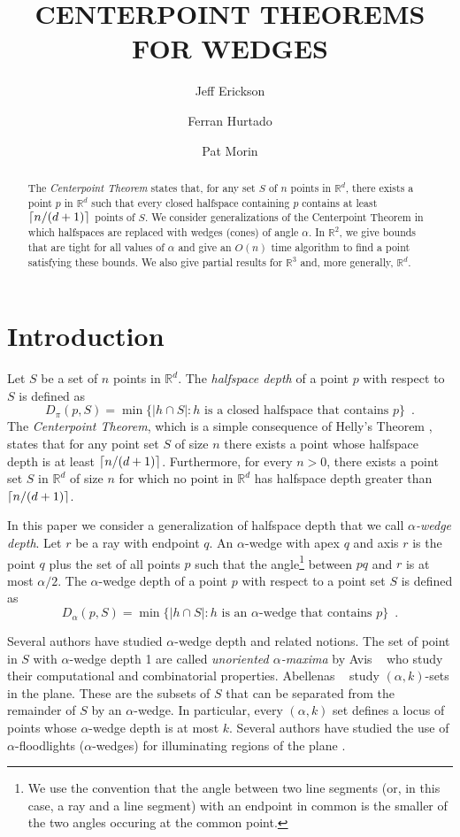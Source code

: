 \documentclass[lotsofwhite]{patmorin}
\title{\MakeUppercase{Centerpoint Theorems for Wedges}}
\author{Jeff Erickson \and
	Ferran Hurtado \and
	Pat Morin}
\date{}
\newcommand{\R}{\mathbb{R}}
\begin{document}
\maketitle

\begin{abstract}
The \emph{Centerpoint Theorem} states that, for any set $S$ of $n$
points in $\R^d$, there exists a point $p$ in $\R^d$
such that every closed halfspace containing $p$ contains at least
$\left\lceil n/(d+1) \right\rceil$ points of $S$.  We consider generalizations of the
Centerpoint Theorem in which halfspaces are replaced with wedges
(cones) of angle $\alpha$.  In $\R^2$, we give bounds that are tight
for all values of $\alpha$ and give an $O(n)$ time algorithm to find a
point satisfying these bounds.  We also give partial results for 
$\R^3$ and, more generally, $\R^d$.
\end{abstract}

\section{Introduction}

Let $S$ be a set of $n$ points in $\R^d$.  The \emph{halfspace
depth} \cite{t75} of a point $p$ with respect to $S$ is defined as
\[
D_\pi(p,S) = 
   \min\{|h\cap S| : \mbox{$h$ is a closed halfspace that contains $p$} \}
    \enspace .
\]
The \emph{Centerpoint Theorem}, which is a simple consequence of
Helly's Theorem \cite{e93}, states that for any point set $S$ of size
$n$ there exists a point whose halfspace depth is at least
$\left\lceil n/(d+1) \right\rceil$.  Furthermore, for every $n>0$, there exists a point
set $S$ in $\R^d$ of size $n$ for which no point in
$\R^d$ has halfspace depth greater than $\left\lceil n/(d+1) \right\rceil$. 

In this paper we consider a generalization of halfspace depth that we
call \emph{$\alpha$-wedge depth}. Let $r$ be a ray with endpoint $q$.
An $\alpha$-wedge with apex $q$ and axis $r$ is the point $q$ plus 
the set of all points
$p$ such that the angle\footnote{We use the convention that the angle
between two line segments (or, in this case, a ray and a line segment)
with an endpoint in common is the smaller of the two angles occuring
at the common point.} between $pq$ and $r$ is at most $\alpha/2$.  The
$\alpha$-wedge depth of a point $p$ with respect to a point set $S$ is
defined as
\[
D_\alpha(p,S) =
   \min\{|h\cap S| : \mbox{$h$ is an $\alpha$-wedge that contains $p$} \} 
   \enspace .
\]

Several authors have studied $\alpha$-wedge depth and related notions.
The set of point in $S$ with $\alpha$-wedge depth 1 are called
\emph{unoriented $\alpha$-maxima} by Avis \etal\ \cite{abd99} who study
their computational and combinatorial properties.  Abellenas \etal\
\cite{achs02} study $(\alpha,k)$-sets in the plane.  These are the
subsets of $S$ that can be separated from the remainder of $S$ by an
$\alpha$-wedge.  In particular, every $(\alpha,k)$ set defines a locus
of points whose $\alpha$-wedge depth is at most $k$.  Several authors
have studied the use of $\alpha$-floodlights ($\alpha$-wedges) for
illuminating regions of the plane \cite{ecoux95,mo01}.
\end{document}
